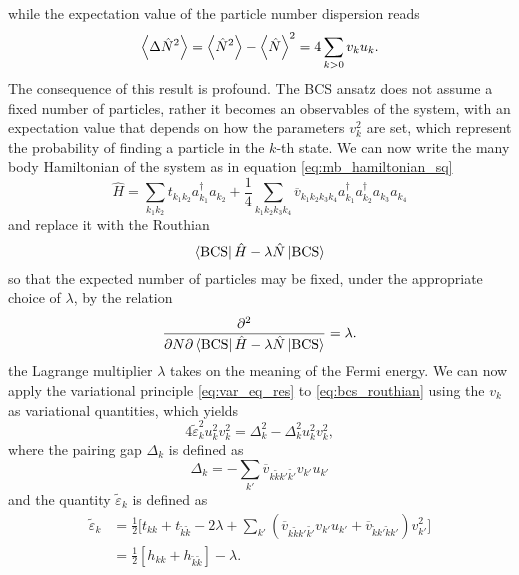 while the expectation value of the particle number dispersion reads
\begin{equation}
\expval{\Delta\hat N ^2} = \expval{\hat N^2} - \expval{\hat N}^2 = 4\sum_{k>0} v_k u_k.
\end{equation}
The consequence of this result is profound. The BCS ansatz does not assume a fixed number of particles, rather it becomes an observables of the system, with an expectation value that depends on how the parameters $v_k^2$ are set, which represent the probability of finding a particle in the $k$-th state.
We can now write the many body Hamiltonian of the system as in equation \eqref{eq:mb_hamiltonian_sq}
\begin{equation}
    \hat H = \sum_{k_1 k_2}t_{k_1k_2} a_{k_1}^\dagger a_{k_2} + \frac 1 4 \sum_{k_1 k_2 k_3 k_4}\overline{v}_{k_1k_2k_3k_4} a_{k_1}^\dagger a_{k_2}^\dagger a_{k_3} a_{k_4}
\end{equation}
and replace it with the Routhian 
\begin{equation}
    \label{eq:bcs_routhian}
    \bra{\text{BCS}} \hat H - \lambda \hat N \ket{\text{BCS}}
\end{equation}
so that the expected number of particles may be fixed, under the appropriate choice of $\lambda$, by the relation
\begin{equation}
\pdv{}{N}{\bra{\text{BCS}}\hat H - \lambda \hat N \ket{\text{BCS}}} = \lambda.
\end{equation}
the Lagrange multiplier $\lambda$ takes on the meaning of the Fermi energy.
We can now apply the variational principle \eqref{eq:var_eq_res} to \eqref{eq:bcs_routhian} using the $v_k$ as variational quantities, which yields 
\begin{equation}
   4\tilde \varepsilon_k ^2 u_k^2 v_k^2 = \Delta_k ^2 - \Delta_k^2 u_k^2v_k^2,
\end{equation}
where the pairing gap $\Delta_k$ is defined as
\begin{equation}
    \label{eq:delta_k}
    \Delta_k = - \sum_{k'}\overline v_{k\tilde k k'\tilde{k'}}v_{k'}u_{k'} 
    \end{equation}
and the quantity $\tilde\varepsilon_k$ is defined as 
\begin{align}
    \label{eq:epsilon}
    \tilde \varepsilon_k &= \frac 1 2 \bigg[t_{kk} + t_{\tilde k \tilde k }-2\lambda +\sum_{k'}(\overline v_{k\tilde k k'\tilde{k'}}v_{k'}u_{k'} + \overline v_{\tilde k k' \tilde k k'})v_{k'}^2\bigg]
    \\&=\frac 1 2 [h_{kk}+h_{\tilde k \tilde k}]-\lambda.
\end{align}

